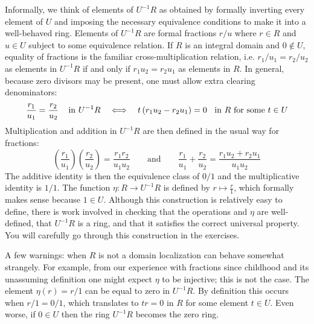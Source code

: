 \documentclass[Notebook.tex]{subfiles}
\begin{document}
Informally, we think of elements of $U^{-1}R$ as obtained by formally inverting every element of $U$ and imposing the necessary equivalence conditions to make it into a well-behaved ring. Elements of $U^{-1}R$ are formal fractions $r/u$ where $r\in R$ and $u \in U$ subject to some equivalence relation. If $R$ is an integral domain and $0\notin U$, equality of fractions is the familiar cross-multiplication relation, i.e. $r_{1}/u_{1} = r_{2}/u_{2}$ as elements in $U^{-1}R$ if and only if $r_{1}u_{2}=r_{2}u_{1}$ as elements in $R$. In general, because zero divisors may be present, one must allow extra clearing denominators:
\[
\frac{r_{1}}{u_1}=\frac{r_2}{u_2} \text{\;\;\; in $U^{-1}R$} 
\quad \Longleftrightarrow \quad
t\left(r_{1}u_{2}-r_{2}u_{1}\right) = 0 \text{\;\; in $R$ for some $t\in U$}
\]
Multiplication and addition in $U^{-1}R$ are then defined in the usual way for fractions:
\[
\left(\frac{r_{1}}{u_1}\right)\left(\frac{r_2}{u_2}\right)=\frac{r_1r_2}{u_1u_2} \quad \quad \text{and} \quad \quad \frac{r_{1}}{u_1}+\frac{r_2}{u_2} = \frac{r_1u_{2}+r_{2}u_{1}}{u_1u_2}
\]
The additive identity is then the equivalence class of $0/1$ and the multiplicative identity is $1/1$. The function $\eta:R \to U^{-1}R$ is defined by $r \mapsto \frac{r}{1}$, which formally makes sense because $1 \in U$. Although this construction is relatively easy to define, there is work involved in checking that the operations and $\eta$ are well-defined, that $U^{-1}R$ is a ring, and that it satisfies the correct universal property. You will carefully go through this construction in the exercises. 

A few warnings: when $R$ is not a domain localization can behave somewhat strangely. For example, from our experience with fractions since childhood and its unassuming definition one might expect $\eta$ to be injective; this is not the case. The element $\eta(r)=r/1$ can be equal to zero in $U^{-1}R$. By definition this occurs when $r/1 = 0/1$, which translates to $tr=0$ in $R$ for some element $t\in U$. Even worse, if $0 \in U$ then the ring $U^{-1}R$ becomes the zero ring. 

\hrulefill
\end{document}
